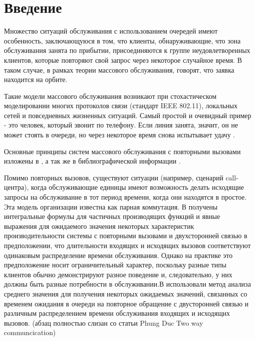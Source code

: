 \section* {Введение}
Множество ситуаций обслуживания с использованием очередей имеют особенность, заключающуюся в том, что клиенты, обнаруживающие, что зона обслуживания занята по прибытии, присоединяются к группе неудовлетворенных клиентов, которые повторяют свой запрос через некоторое случайное время. В таком случае, в рамках теории массового обслуживания, говорят, что заявка находится на орбите.


Такие модели массового обслуживания возникают при стохастическом моделировании многих протоколов связи (стандарт IEEE 802.11), локальных сетей и повседневных жизненных ситуаций. Самый простой и очевидный пример - это человек, который звонит по телефону. Если линия занята, значит, он не может стоять в очереди, но через некоторое время снова испытывает удачу \cite{erlang1909theory}.  


Основные принципы систем массового обслуживания с повторными вызовами изложены в \cite{jesus2008retrial,falin1997retrial}, а так же в библиографической информации \cite{artalejo2010accessible}.

Помимо повторных вызовов, существуют ситуации (например, сценарий call-центра), когда обслуживающие единицы имеют возможность делать исходящие запросы на обслуживание в тот период времени, когда они находятся в простое. Эта модель организации известна как парная коммутация. В \cite{falin1979model} получены интегральные формулы для частичных производящих функций и явные выражения для ожидаемого значения некоторых характеристик производительности системы с повторными вызовами и двухсторонней связью в предположении, что длительности входящих и исходящих вызовов соответствуют одинаковым распределение времени обслуживания. Однако на практике это предположение носит ограничительный характер, поскольку разные типы клиентов обычно демонстрируют разное поведение и, следовательно, у них должны быть разные потребности в обслуживании.В \cite{artalejo2010mean} использовали метод анализа среднего значения для получения некоторых ожидаемых значений, связанных со временем ожидания в очереди на повторное обращение с двусторонней связью и различным распределением времени обслуживания входящих и исходящих вызовов. (абзац полностью слизан со статьи Phung Duc Two way communcication)







